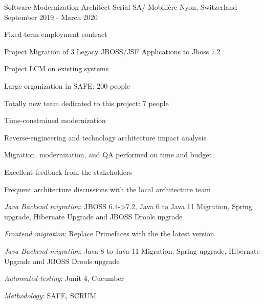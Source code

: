 \begin{cventries}
        \cventry
        {Software Modernization Architect} %
        {Serial SA/ Mobilière} %
        {Nyon, Switzerland} %
        {September 2019 - March 2020} %
        {
            \experience
            {
                \begin{cvitems} %
                    \item{Fixed-term employment contract}
                    \item{Project Migration of 3 Legacy JBOSS/JSF Applications to Jboss 7.2}
                    \item{Project LCM on existing systems}
                    \item{Large organization in SAFE: 200 people}
                    \item{Totally new team dedicated to this project: 7 people}
                    \item{Time-constrained modernization}
                    \item{Reverse-engineering and technology architecture impact analysis}
                \end{cvitems}
            }
            {
                \begin{cvitems} %
                    \item{Migration, modernization, and QA performed on time and budget}
                    \item{Excellent feedback from the stakeholders}
                    \item{Frequent architecture discussions with the local architecture team}
                \end{cvitems}
            }
            {
                \begin{cvitems} %
                    \item{\emph{Java Backend migration}: JBOSS 6.4->7.2, Java 6 to Java 11 Migration, Spring upgrade, Hibernate Upgrade and JBOSS Drools upgrade}
                    \item{\emph{Frontend migration}: Replace Primefaces with the the latest version}
                    \item{\emph{Java Backend migration}: Java 8 to Java 11 Migration, Spring upgrade, Hibernate Upgrade and JBOSS Drools upgrade}
                    \item{\emph{Automated testing}: Junit 4, Cucumber}
                    \item{\emph{Methodology}: SAFE, SCRUM}
                \end{cvitems}
            }
        }


\end{cventries}
